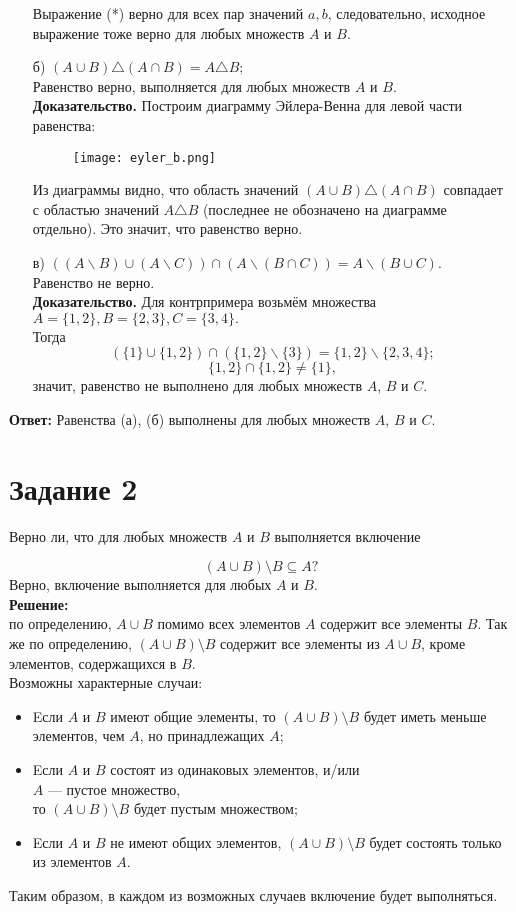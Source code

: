 \documentclass[a4paper,12pt]{article}
\begin{document}
\begin{itemize}
Выражение (*) верно для всех пар значений $a, b$, следовательно, исходное выражение тоже верно для любых множеств $A$ и $B$.

\item[б)] 
 $(A\cup B)\triangle (A\cap B)= A \triangle B;$\\
Равенство верно, выполняется для любых множеств $A$ и $B$. \\ {\bf Доказательство.} Построим диаграмму Эйлера-Венна для левой части равенства:\\
\begin{figure}[h]
\centering
\texttt{[image: eyler\_b.png]}
\end{figure}

Из диаграммы видно, что область значений  $(A\cup B)\triangle (A\cap B)$ совпадает с областью значений $A \triangle B$ (последнее не обозначено на диаграмме отдельно). Это значит, что равенство верно.
\item[в)] 
 $((A \backslash B) \cup(A \backslash C)) \cap(A \backslash(B \cap C))=A \backslash(B \cup C).$ \\
 Равенство не верно. \\ {\bf Доказательство.} Для контрпримера возьмём множества \\
 $A = \{1,2\}, B = \{2,3\}, C = \{3,4\}.$ \\
 Тогда
$$ (\{1\} \cup\{1,2\}) \cap (\{1,2\} \backslash \{3\})=\{1,2\} \backslash \{2,3,4\} ; $$
$$ \{1,2\} \cap \{1,2\} \neq \{1\}, $$
значит, равенство не выполнено для любых множеств $A$, $B$ и $C$.\\
\end{itemize}
{\bf Ответ:} Равенства (а), (б) выполнены для любых множеств $A$, $B$ и $C$.\\
\section*{Задание 2}
Верно ли, что для любых множеств $A$ и $B$ выполняется включение

$$(A\cup B)\setminus B \subseteq A?$$
Верно, включение выполняется для любых $A$ и $B$. \\
{\bf Решение:} \\
по определению, $A\cup B$ помимо всех элементов $A$ содержит все элементы $B$. Так же по определению, $(A\cup B)\setminus B$ содержит все элементы из $A\cup B$, кроме элементов, содержащихся в $B$. \\
Возможны характерные случаи: 
\begin{itemize}
\item Eсли $A$ и $B$ имеют общие элементы, то $(A\cup B)\setminus B$ будет иметь меньше элементов, чем $A$, но принадлежащих $A$;
\item Eсли $A$ и $B$ состоят из одинаковых элементов, и/или \\
 $A$ — пустое множество, \\
 то $(A\cup B)\setminus B$ будет пустым множеством;
\item Eсли $A$ и $B$ не имеют общих элементов, $(A\cup B)\setminus B$ будет состоять только из элементов $A$.
\end{itemize}
Таким образом, в каждом из возможных случаев включение будет выполняться.
\end{document}
